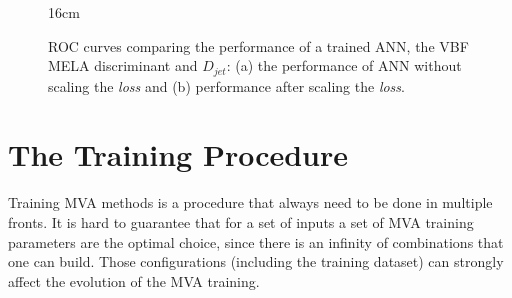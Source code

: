 \begin{figure}[hbtp]{16cm}
	\caption{ROC curves comparing the performance of a trained ANN, the VBF MELA discriminant and $D_{jet}$: (a) the performance of ANN without scaling the \textit{loss} and (b) performance after scaling the \textit{loss}.}
	\centering
	\quad
	\quad
	\label{fig:scaling_training_effect}
\end{figure}

\section{The Training Procedure}
\label{subsec:training_procedure}
Training MVA methods is a procedure that always need to be done in multiple fronts. It is hard to guarantee that for a set of inputs a set of MVA training parameters are the optimal choice, since there is an infinity of combinations that one can build. Those configurations (including the training dataset) can strongly affect the evolution of the MVA training. 

